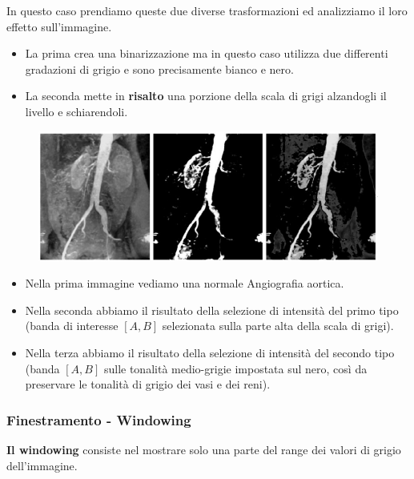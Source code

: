 In questo caso prendiamo queste due diverse trasformazioni ed analizziamo il loro effetto sull'immagine.

\begin{itemize}
    \item La prima crea una binarizzazione ma in questo caso utilizza due differenti gradazioni di grigio e sono precisamente bianco e nero.
    \item La seconda mette in \textbf{risalto} una porzione della scala di grigi alzandogli il livello e schiarendoli.
\end{itemize}

\begin{figure}[H]
    \centering
    \includegraphics[width=\linewidth, keepaspectratio]{capitoli/immagini/imgs/angiografie_esempio_7.jpg}
\end{figure}

\begin{itemize}
    \item Nella prima immagine vediamo una normale Angiografia aortica.
    \item Nella seconda abbiamo il risultato della selezione di intensità del primo tipo (banda di
          interesse $[A, B]$ selezionata sulla parte alta della scala di grigi).
    \item Nella terza abbiamo il risultato della selezione di intensità del secondo tipo (banda
          $[A, B]$ sulle tonalità medio-grigie impostata sul nero, così da
          preservare le tonalità di grigio dei vasi e dei reni).
\end{itemize}

\subsubsection{Finestramento - Windowing}

\begin{definition}
    \textbf{Il windowing} consiste nel mostrare solo una parte del range dei valori di grigio dell'immagine.
\end{definition}

